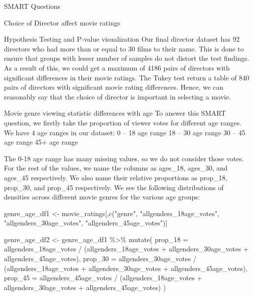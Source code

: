 \documentclass[
  ignorenonframetext,
]{beamer}
\newenvironment{Shaded}{\begin{snugshade}}{\end{snugshade}}
\newcommand{\AttributeTok}[1]{\textcolor[rgb]{0.77,0.63,0.00}{#1}}
\newcommand{\FunctionTok}[1]{\textcolor[rgb]{0.00,0.00,0.00}{#1}}
\newcommand{\NormalTok}[1]{#1}
\newcommand{\OtherTok}[1]{\textcolor[rgb]{0.56,0.35,0.01}{#1}}
\newcommand{\SpecialCharTok}[1]{\textcolor[rgb]{0.00,0.00,0.00}{#1}}
\newcommand{\StringTok}[1]{\textcolor[rgb]{0.31,0.60,0.02}{#1}}
\begin{document}
\begin{frame}[fragile]{SMART Questions}
\begin{block}{Choice of Director affect movie ratings}
\begin{block}{Hypothesis Testing and P-value visualization}
Our final director dataset has 92 directors who had more than or equal
to 30 films to their name. This is done to ensure that groups with
lesser number of samples do not distort the test findings. As a result
of this, we could get a maximum of 4186 pairs of directors with
significant differences in their movie ratings. The Tukey test return a
table of 840 pairs of directors with significant movie rating
differences. Hence, we can reasonably say that the choice of director is
important in selecting a movie.
\end{block}
\end{block}

\begin{block}{Movie genre viewing statistic differences with age}
\protect\hypertarget{movie-genre-viewing-statistic-differences-with-age}{}
To answer this SMART question, we firstly take the proportion of viewer
votes for different age ranges. We have 4 age ranges in our dataset: 0
-- 18 age range 18 -- 30 age range 30 -- 45 age range 45+ age range

The 0-18 age range has many missing values, so we do not consider those
votes. For the rest of the values, we name the columns as ages\_18,
ages\_30, and ages\_45 respectively. We also name their relative
proportions as prop\_18, prop\_30, and prop\_45 respectively. We see the
following distributions of densities across different movie genres for
the various age groups:

\begin{Shaded}
\begin{Highlighting}[]
\NormalTok{genre\_age\_df1 }\OtherTok{\textless{}{-}}\NormalTok{ movie\_ratings[,}\FunctionTok{c}\NormalTok{(}\StringTok{"genre"}\NormalTok{, }\StringTok{"allgenders\_18age\_votes"}\NormalTok{, }\StringTok{"allgenders\_30age\_votes"}\NormalTok{, }\StringTok{"allgenders\_45age\_votes"}\NormalTok{)]}

\NormalTok{genre\_age\_df2 }\OtherTok{\textless{}{-}}\NormalTok{ genre\_age\_df1 }\SpecialCharTok{\%\textgreater{}\%}
    \FunctionTok{mutate}\NormalTok{(}
      \AttributeTok{prop\_18 =}\NormalTok{ allgenders\_18age\_votes }\SpecialCharTok{/}\NormalTok{ (allgenders\_18age\_votes }\SpecialCharTok{+}\NormalTok{ allgenders\_30age\_votes }\SpecialCharTok{+}\NormalTok{ allgenders\_45age\_votes),}
      \AttributeTok{prop\_30 =}\NormalTok{ allgenders\_30age\_votes }\SpecialCharTok{/}\NormalTok{ (allgenders\_18age\_votes }\SpecialCharTok{+}\NormalTok{ allgenders\_30age\_votes }\SpecialCharTok{+}\NormalTok{ allgenders\_45age\_votes),}
      \AttributeTok{prop\_45 =}\NormalTok{ allgenders\_45age\_votes }\SpecialCharTok{/}\NormalTok{ (allgenders\_18age\_votes }\SpecialCharTok{+}\NormalTok{ allgenders\_30age\_votes }\SpecialCharTok{+}\NormalTok{ allgenders\_45age\_votes)}
\NormalTok{    )}


\end{Highlighting}
\end{Shaded}
\end{block}
\end{frame}
\end{document}
